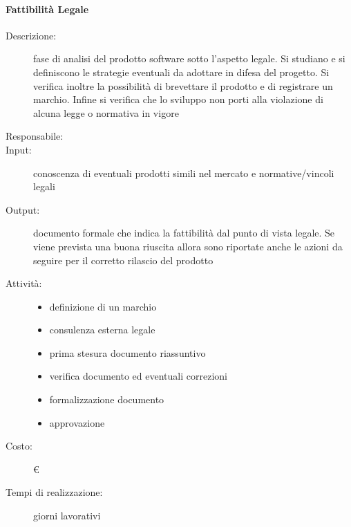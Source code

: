 \paragraph{Fattibilità Legale}
\begin{description}
\item[Descrizione:] fase di analisi del prodotto software sotto l'aspetto legale. Si studiano e
si definiscono le strategie eventuali da adottare in difesa del progetto. Si verifica inoltre
la possibilità di brevettare il prodotto e di registrare un marchio. Infine si verifica che
lo sviluppo non porti alla violazione di alcuna legge o normativa in vigore\\

\item[Responsabile:]

\item[Input:] conoscenza di eventuali prodotti simili nel mercato e normative/vincoli legali\\

\item[Output:] documento formale che indica la fattibilità dal punto di vista legale. Se viene
prevista una buona riuscita allora sono riportate anche le azioni da seguire per il corretto
rilascio del prodotto

\item[Attività:]
\begin{itemize}
\item definizione di un marchio
\item consulenza esterna legale
\item prima stesura documento riassuntivo
\item verifica documento ed eventuali correzioni
\item formalizzazione documento
\item approvazione
\end{itemize}
\item[Costo:] \euro{}
\item[Tempi di realizzazione:]  giorni lavorativi
\end{description}



